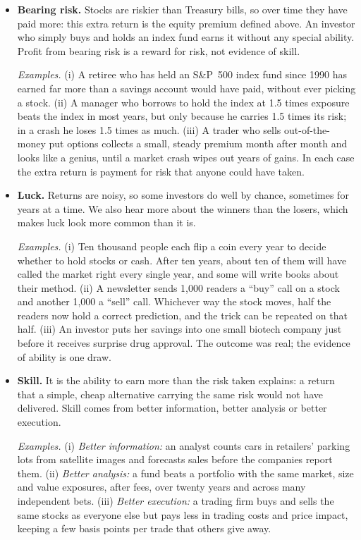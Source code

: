 \begin{itemize}
  \item \textbf{Bearing risk.} Stocks are riskier than Treasury bills, so over
  time they have paid more: this extra return is the equity premium defined
  above. An investor who simply buys and holds an index fund earns it without
  any special ability. Profit from bearing risk is a reward for risk, not
  evidence of skill.

  \emph{Examples.} (i) A retiree who has held an S\&P~500 index fund since
  1990 has earned far more than a savings account would have paid, without
  ever picking a stock. (ii) A manager who borrows to hold the index at
  1.5 times exposure beats the index in most years, but only because he
  carries 1.5 times its risk; in a crash he loses 1.5 times as much.
  (iii) A trader who sells out-of-the-money put options collects a small,
  steady premium month after month and looks like a genius, until a market
  crash wipes out years of gains. In each case the extra return is payment
  for risk that anyone could have taken.

  \item \textbf{Luck.} Returns are noisy, so some investors do well by
  chance, sometimes for years at a time. We also hear more about the winners
  than the losers, which makes luck look more common than it is.

  \emph{Examples.} (i) Ten thousand people each flip a coin every year to
  decide whether to hold stocks or cash. After ten years, about ten of them
  will have called the market right every single year, and some will write
  books about their method. (ii) A newsletter sends 1{,}000 readers a
  ``buy'' call on a stock and another 1{,}000 a ``sell'' call. Whichever way
  the stock moves, half the readers now hold a correct prediction, and the
  trick can be repeated on that half. (iii) An investor puts her savings into
  one small biotech company just before it receives surprise drug approval.
  The outcome was real; the evidence of ability is one draw.

  \item \textbf{Skill.} It is the ability to earn more than the
  risk taken explains: a return that a simple, cheap alternative carrying the
  same risk would not have delivered. Skill comes from better information,
  better analysis or better execution.

  \emph{Examples.} (i) \emph{Better information:} an analyst counts cars in
  retailers' parking lots from satellite images and forecasts sales before
  the companies report them. (ii) \emph{Better analysis:} a fund beats a
  portfolio with the same market, size and value exposures, after fees, over
  twenty years and across many independent bets. (iii) \emph{Better
  execution:} a trading firm buys and sells the same stocks as everyone else
  but pays less in trading costs and price impact, keeping a few basis points
  per trade that others give away.
\end{itemize}

